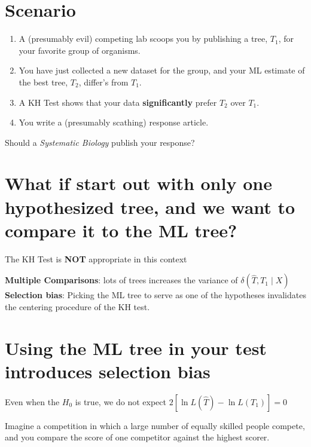 \documentclass[landscape]{foils}
\begin{document}
\section*{Scenario}
\begin{enumerate}
	\item A (presumably evil) competing lab scoops you by publishing a tree, $T_1$, for your favorite group of organisms.
	\item You have just collected a new dataset for the group, and your ML estimate of the best tree, $T_2$, differ's from $T_1$.
	\item A KH Test shows that your data {\bf significantly} prefer $T_2$ over $T_1$.
	\item You write a (presumably scathing) response article.
\end{enumerate}
Should a {\em Systematic Biology} publish your response?

\myNewSlide
\section*{What if start out with only one hypothesized tree, and we want to compare it to the ML tree?}
The KH Test is {\bf NOT} appropriate in this context \citep[see][for discussion of this point]{GoldmanAR2000}
	
{\bf Multiple Comparisons}: lots of trees increases the variance of $\delta(\hat{T},T_1 \mid X)$\\

{\bf Selection bias}: Picking the ML tree to serve as one of the hypotheses invalidates the centering procedure of the KH test.

\myNewSlide
\section*{Using the ML tree in your test introduces selection bias}
Even when the $H_0$ is true, we do not expect $2\left[\ln L(\hat{T}) - \ln L(T_1)\right]= 0$

Imagine a competition in which a large number of equally skilled people compete, and you compare the score of one competitor against the highest scorer.
\end{document}
